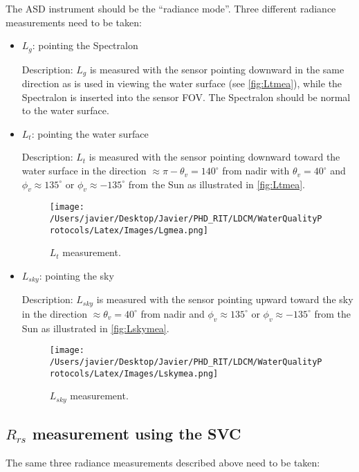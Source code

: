 \begin{appendices}
The ASD instrument should be the ``radiance mode''. Three different radiance measurements need to be taken:
\begin{itemize}[itemsep=2pt,parsep=2pt]
	\item $L_g$: pointing the Spectralon

Description: $L_g$ is measured with the sensor pointing downward in the same direction as is used in viewing the water surface (see \autoref{fig:Ltmea}), while the Spectralon is inserted into the sensor FOV. The Spectralon should be normal to the water surface.

	\item $L_t$: pointing the water surface

Description: $L_t$ is measured with the sensor pointing downward toward the water surface in the direction $\approx \pi-\theta_v = 140^\circ$ from nadir with $\theta_v = 40^\circ$ and $\phi_v \approx 135^\circ$ or $\phi_v \approx -135^\circ$ from the Sun as illustrated in \autoref{fig:Ltmea}.

\begin{figure}[htb]
\centering
    \texttt{[image: /Users/javier/Desktop/Javier/PHD\_RIT/LDCM/WaterQualityProtocols/Latex/Images/Lgmea.png]}
    \vspace{0.5cm}
   \caption[]{\label{fig:Ltmea} $L_t$ measurement.}
\end{figure}

	\item $L_{sky}$: pointing the sky

Description: $L_{sky}$ is measured with the sensor pointing upward toward the sky in the direction $\approx \theta_v = 40^\circ$ from nadir and $\phi_v \approx 135^\circ$ or $\phi_v \approx -135^\circ$ from the Sun as illustrated in \autoref{fig:Lskymea}.

\begin{figure}[htb]
\centering
    \texttt{[image: /Users/javier/Desktop/Javier/PHD\_RIT/LDCM/WaterQualityProtocols/Latex/Images/Lskymea.png]}
    \vspace{0.5cm}
   \caption[]{\label{fig:Lskymea} $L_{sky}$ measurement.}
\end{figure}

\end{itemize}

\subsection{\texorpdfstring{$R_{rs}$}{Rrs} measurement using the SVC}
The same three radiance measurements described above need to be taken:


\end{appendices}
